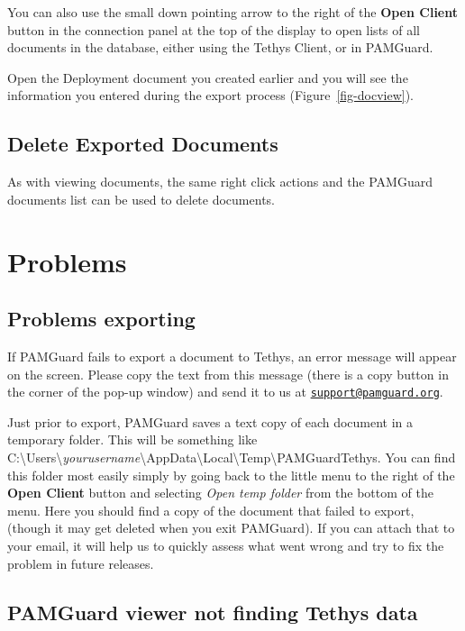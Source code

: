 \documentclass[
]{article}
\begin{document}
You can also use the small down pointing arrow to the right of the
\textbf{Open Client} button in the connection panel at the top of the
display to open lists of all documents in the database, either using the
Tethys Client, or in PAMGuard.

Open the Deployment document you created earlier and you will see the
information you entered during the export process
(Figure~\ref{fig-docview}).

\subsection{Delete Exported Documents}\label{delete-exported-documents}

As with viewing documents, the same right click actions and the PAMGuard
documents list can be used to delete documents.

\section{Problems}\label{problems}

\subsection{Problems exporting}\label{problems-exporting}

If PAMGuard fails to export a document to Tethys, an error message will
appear on the screen. Please copy the text from this message (there is a
copy button in the corner of the pop-up window) and send it to us at
\href{mailto:support@pamguard.org}{\nolinkurl{support@pamguard.org}}.

Just prior to export, PAMGuard saves a text copy of each document in a
temporary folder. This will be something like
C:\textbackslash Users\textbackslash{}\emph{yourusername}\textbackslash AppData\textbackslash Local\textbackslash Temp\textbackslash PAMGuardTethys.
You can find this folder most easily simply by going back to the little
menu to the right of the \textbf{Open Client} button and selecting
\emph{Open temp folder} from the bottom of the menu. Here you should
find a copy of the document that failed to export, (though it may get
deleted when you exit PAMGuard). If you can attach that to your email,
it will help us to quickly assess what went wrong and try to fix the
problem in future releases.

\subsection{PAMGuard viewer not finding Tethys
data}\label{pamguard-viewer-not-finding-tethys-data}
\end{document}
